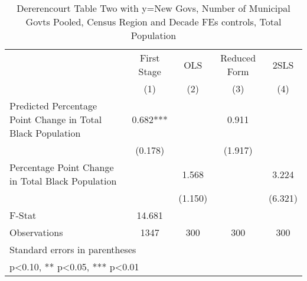 \begin{table}[htbp]\centering
\def\sym#1{\ifmmode^{#1}\else\(^{#1}\)\fi}
\caption{Dererencourt Table Two with y=New Govs, Number of Municipal Govts  Pooled, Census Region and Decade FEs controls, Total Population}
\begin{tabular}{l*{4}{c}}
\toprule
                    & First Stage   &         OLS   &Reduced Form   &        2SLS   \\
                    &\multicolumn{1}{c}{(1)}   &\multicolumn{1}{c}{(2)}   &\multicolumn{1}{c}{(3)}   &\multicolumn{1}{c}{(4)}   \\
\midrule
Predicted Percentage Point Change in Total Black Population&       0.682***&               &       0.911   &               \\
                    &     (0.178)   &               &     (1.917)   &               \\
\addlinespace
Percentage Point Change in Total Black Population&               &       1.568   &               &       3.224   \\
                    &               &     (1.150)   &               &     (6.321)   \\
\midrule
F-Stat              &      14.681   &               &               &               \\
Observations        &        1347   &         300   &         300   &         300   \\
\bottomrule
\multicolumn{5}{l}{\footnotesize Standard errors in parentheses}\\
\multicolumn{5}{l}{\footnotesize * p<0.10, ** p<0.05, *** p<0.01}\\
\end{tabular}
\end{table}

